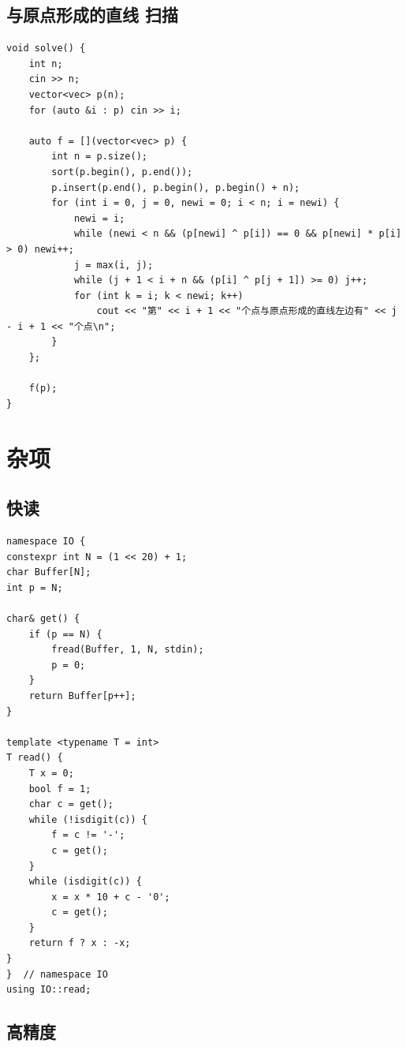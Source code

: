 \documentclass[UTF8, twoside]{ctexart}
\begin{document}
\begin{sloppypar}
\subsection{与原点形成的直线 扫描}

\begin{lstlisting}[style=cpp]
void solve() {
    int n;
    cin >> n;
    vector<vec> p(n);
    for (auto &i : p) cin >> i;

    auto f = [](vector<vec> p) {
        int n = p.size();
        sort(p.begin(), p.end());
        p.insert(p.end(), p.begin(), p.begin() + n);
        for (int i = 0, j = 0, newi = 0; i < n; i = newi) {
            newi = i;
            while (newi < n && (p[newi] ^ p[i]) == 0 && p[newi] * p[i] > 0) newi++;
            j = max(i, j);
            while (j + 1 < i + n && (p[i] ^ p[j + 1]) >= 0) j++;
            for (int k = i; k < newi; k++)
                cout << "第" << i + 1 << "个点与原点形成的直线左边有" << j - i + 1 << "个点\n";
        }
    };

    f(p);
}
\end{lstlisting}

\clearpage

\section{杂项}

\subsection{快读}

\begin{lstlisting}[style=cpp]
namespace IO {
constexpr int N = (1 << 20) + 1;
char Buffer[N];
int p = N;

char& get() {
    if (p == N) {
        fread(Buffer, 1, N, stdin);
        p = 0;
    }
    return Buffer[p++];
}

template <typename T = int>
T read() {
    T x = 0;
    bool f = 1;
    char c = get();
    while (!isdigit(c)) {
        f = c != '-';
        c = get();
    }
    while (isdigit(c)) {
        x = x * 10 + c - '0';
        c = get();
    }
    return f ? x : -x;
}
}  // namespace IO
using IO::read;
\end{lstlisting}

\subsection{高精度}


\end{sloppypar}
\end{document}
